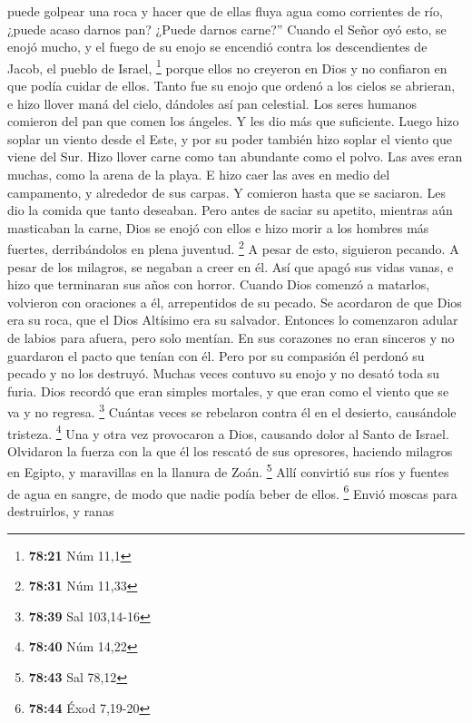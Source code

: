 puede golpear una roca y hacer que de ellas fluya agua como corrientes
de río, ¿puede acaso darnos pan? ¿Puede darnos carne?'' 
Cuando el Señor oyó esto, se enojó mucho, y el fuego de su enojo se
encendió contra los descendientes de Jacob, el pueblo de Israel,
\footnote{\textbf{78:21} Núm 11,1}  porque ellos no
creyeron en Dios y no confiaron en que podía cuidar de ellos.
 Tanto fue su enojo que ordenó a los cielos se abrieran,
 e hizo llover maná del cielo, dándoles así pan celestial.
 Los seres humanos comieron del pan que comen los ángeles.
Y les dio más que suficiente.  Luego hizo soplar un viento
desde el Este, y por su poder también hizo soplar el viento que viene
del Sur.  Hizo llover carne como tan abundante como el
polvo. Las aves eran muchas, como la arena de la playa.  E
hizo caer las aves en medio del campamento, y alrededor de sus carpas.
 Y comieron hasta que se saciaron. Les dio la comida que
tanto deseaban.  Pero antes de saciar su apetito, mientras
aún masticaban la carne,  Dios se enojó con ellos e hizo
morir a los hombres más fuertes, derribándolos en plena juventud.
\footnote{\textbf{78:31} Núm 11,33}  A pesar de esto,
siguieron pecando. A pesar de los milagros, se negaban a creer en él.
 Así que apagó sus vidas vanas, e hizo que terminaran sus
años con horror.  Cuando Dios comenzó a matarlos, volvieron
con oraciones a él, arrepentidos de su pecado.  Se
acordaron de que Dios era su roca, que el Dios Altísimo era su salvador.
 Entonces lo comenzaron adular de labios para afuera, pero
solo mentían.  En sus corazones no eran sinceros y no
guardaron el pacto que tenían con él.  Pero por su
compasión él perdonó su pecado y no los destruyó. Muchas veces contuvo
su enojo y no desató toda su furia.  Dios recordó que eran
simples mortales, y que eran como el viento que se va y no regresa.
\footnote{\textbf{78:39} Sal 103,14-16}  Cuántas veces se
rebelaron contra él en el desierto, causándole tristeza. \footnote{\textbf{78:40}
  Núm 14,22}  Una y otra vez provocaron a Dios, causando
dolor al Santo de Israel.  Olvidaron la fuerza con la que
él los rescató de sus opresores,  haciendo milagros en
Egipto, y maravillas en la llanura de Zoán. \footnote{\textbf{78:43} Sal
  78,12}  Allí convirtió sus ríos y fuentes de agua en
sangre, de modo que nadie podía beber de ellos. \footnote{\textbf{78:44}
  Éxod 7,19-20}  Envió moscas para destruirlos, y ranas
